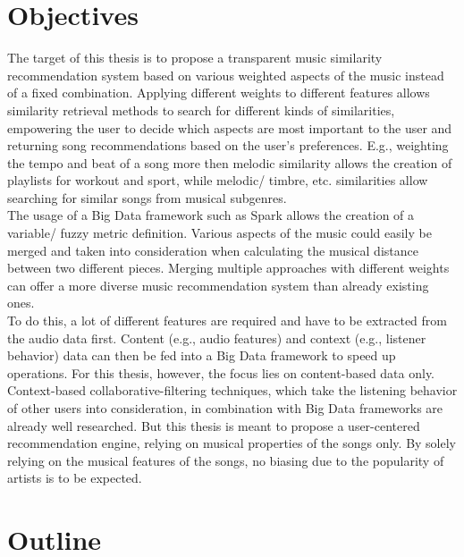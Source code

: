 \section{Objectives}

The target of this thesis is to propose a transparent music similarity recommendation system based on various weighted aspects of the music instead of a fixed combination. Applying different weights to different features allows similarity retrieval methods to search for different kinds of similarities, empowering the user to decide which aspects are most important to the user and returning song recommendations based on the user's preferences. E.g., weighting the tempo and beat of a song more then melodic similarity allows the creation of playlists for workout and sport, while melodic/ timbre, etc. similarities allow searching for similar songs from musical subgenres.\\ 
The usage of a Big Data framework such as Spark allows the creation of a variable/ fuzzy metric definition. Various aspects of the music could easily be merged and taken into consideration when calculating the musical distance between two different pieces. %
Merging multiple approaches with different weights can offer a more diverse music recommendation system than already existing ones.\\ 
To do this, a lot of different features are required and have to be extracted from the audio data first. Content (e.g., audio features) and context (e.g., listener behavior) data can then be fed into a Big Data framework to speed up operations. For this thesis, however, the focus lies on content-based data only.\\ 
Context-based collaborative-filtering techniques, which take the listening behavior of other users into consideration, in combination with Big Data frameworks are already well researched. But this thesis is meant to propose a user-centered recommendation engine, relying on musical properties of the songs only. By solely relying on the musical features of the songs, no biasing due to the popularity of artists is to be expected.\\

\section{Outline}

